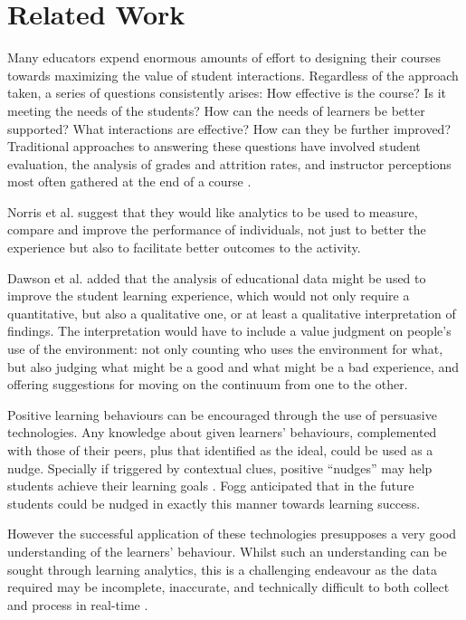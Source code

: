 \section{Related Work}
Many educators expend enormous amounts of effort to designing their
courses towards maximizing the value of student
interactions. Regardless of the approach taken, a series of questions
consistently arises: How effective is the course? Is it meeting the
needs of the students? How can the needs of learners be better
supported? What interactions are effective? How can they be further
improved? Traditional approaches to answering these questions have
involved student evaluation, the analysis of grades and attrition
rates, and instructor perceptions most often gathered at the end of a
course \cite{tayl16_1}.

Norris et al. \cite{campbell2007academic} suggest that they would like
analytics to be used to measure, compare and improve the performance
of individuals, not just to better the experience but also to
facilitate better outcomes to the activity.

Dawson et al. \cite{doi} added that the analysis of educational data
might be used to improve the student learning experience, which would
not only require a quantitative, but also a qualitative one, or at
least a qualitative interpretation of findings. The interpretation
would have to include a value judgment on people’s use of the
environment: not only counting who uses the environment for what, but
also judging what might be a good and what might be a bad experience,
and offering suggestions for moving on the continuum from one to the
other.

Positive learning behaviours can be encouraged through the use of
persuasive technologies. Any knowledge about given learners’
behaviours, complemented with those of their peers, plus that
identified as the ideal, could be used as a nudge. Specially if
triggered by contextual clues, positive ``nudges'' may help students
achieve their learning goals \cite{wilde2016understanding}. Fogg
\cite{Fogg} anticipated that in the future students could be nudged in
exactly this manner towards learning success.

However the successful application of these technologies presupposes a
very good understanding of the learners’ behaviour. Whilst such an
understanding can be sought through learning analytics, this is a
challenging endeavour as the data required may be incomplete,
inaccurate, and technically difficult to both collect and process in
real-time \cite{wilde2016understanding}. 

